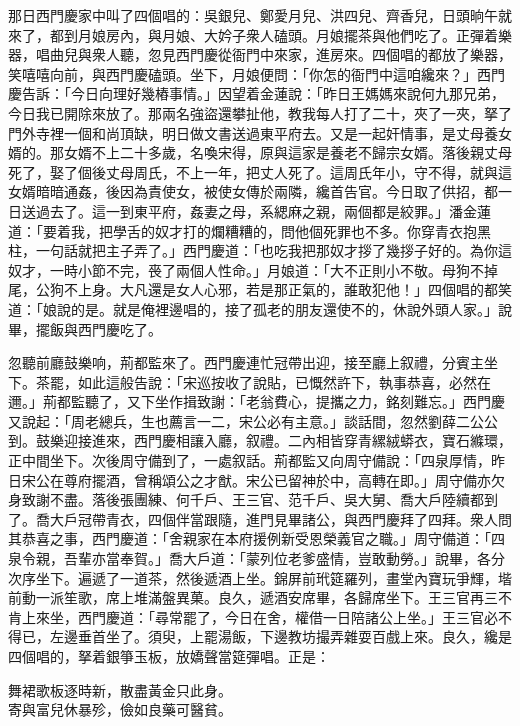 那日西門慶家中叫了四個唱的：吳銀兒、鄭愛月兒、洪四兒、齊香兒，日頭晌午就來了，都到月娘房內，與月娘、大妗子衆人磕頭。月娘擺茶與他們吃了。正彈着樂器，唱曲兒與衆人聽，忽見西門慶從衙門中來家，進房來。四個唱的都放了樂器，笑嘻嘻向前，與西門慶磕頭。坐下，月娘便問：「你怎的衙門中這咱纔來？」西門慶告訴：「今日向理好幾樁事情。」因望着金蓮說：「昨日王媽媽來說何九那兄弟，今日我已開除來放了。那兩名強盜還攀扯他，教我每人打了二十，夾了一夾，拏了門外寺裡一個和尚頂缺，明日做文書送過東平府去。又是一起奸情事，是丈母養女婿的。那女婿不上二十多歲，名喚宋得，原與這家是養老不歸宗女婿。落後親丈母死了，娶了個後丈母周氏，不上一年，把丈人死了。這周氏年小，守不得，就與這女婿暗暗通姦，後因為責使女，被使女傳於兩隣，纔首告官。今日取了供招，都一日送過去了。這一到東平府，姦妻之母，系緦麻之親，兩個都是絞罪。」潘金蓮道：「要着我，把學舌的奴才打的爛糟糟的，問他個死罪也不多。你穿青衣抱黑柱，一句話就把主子弄了。」{}{}西門慶道：「也吃我把那奴才拶了幾拶子好的。為你這奴才，一時小節不完，䘮了兩個人性命。」月娘道：「大不正則小不敬。母狗不掉尾，公狗不上身。大凡還是女人心邪，若是那正氣的，誰敢犯他！」{}四個唱的都笑道：「娘說的是。就是俺裡邊唱的，接了孤老的朋友還使不的，休說外頭人家。」說畢，擺飯與西門慶吃了。

忽聽前廳鼓樂响，荊都監來了。西門慶連忙冠帶出迎，接至廳上叙禮，分賓主坐下。茶罷，如此這般告說：「宋巡按收了說貼，已慨然許下，執事恭喜，必然在邇。」荊都監聽了，又下坐作揖致謝：「老翁費心，提攜之力，銘刻難忘。」西門慶又說起：「周老總兵，生也薦言一二，宋公必有主意。」談話間，忽然劉薛二公公到。鼓樂迎接進來，西門慶相讓入廳，叙禮。二內相皆穿青縲絨蟒衣，寶石縧環，正中間坐下。次後周守備到了，一處叙話。荊都監又向周守備說：「四泉厚情，昨日宋公在尊府擺酒，曾稱頌公之才猷。宋公已留神於中，高轉在即。」周守備亦欠身致謝不盡。落後張團練、何千戶、王三官、范千戶、吳大舅、喬大戶陸續都到了。喬大戶冠帶青衣，四個伴當跟隨，{}進門見畢諸公，與西門慶拜了四拜。衆人問其恭喜之事，西門慶道：「舍親家在本府援例新受恩榮義官之職。」周守備道：「四泉令親，吾輩亦當奉賀。」喬大戶道：「蒙列位老爹盛情，{}豈敢動勞。」說畢，各分次序坐下。遍遞了一道茶，然後遞酒上坐。錦屏前玳筵羅列，畫堂內寶玩爭輝，堦前動一派笙歌，席上堆滿盤異菓。良久，遞酒安席畢，各歸席坐下。王三官再三不肯上來坐，西門慶道：「尋常罷了，今日在舍，權借一日陪諸公上坐。」王三官必不得已，左邊垂首坐了。須臾，上罷湯飯，下邊教坊撮弄雜耍百戲上來。良久，纔是四個唱的，拏着銀箏玉板，放嬌聲當筵彈唱。正是：

\begin{myquote} 
舞裙歌板逐時新，散盡黃金只此身。\\寄與富兒休暴殄，儉如良藥可醫貧。
\end{myquote} 

